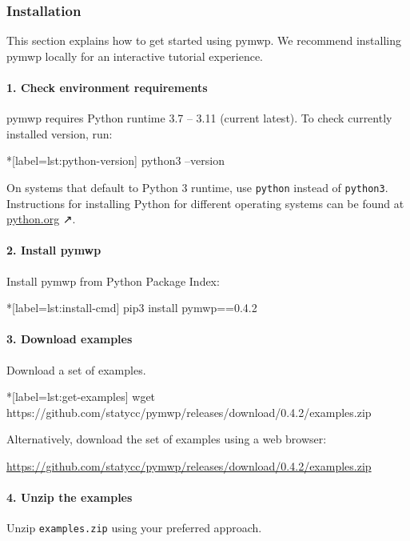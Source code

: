 \subsubsection{Installation}\label{guide-install}

This section explains how to get started using pymwp.
We recommend installing pymwp locally for an interactive tutorial experience.

\paragraph*{1. Check environment requirements}

pymwp requires Python runtime 3.7 -- 3.11 (current latest).
To check currently installed version, run:

\begin{cmdlisting}*[label={lst:python-version}]
python3 --version
\end{cmdlisting}

On systems that default to Python 3 runtime, use \texttt{python} instead of \texttt{python3}.
Instructions for installing Python for different operating systems can be found at \href{https://python.org}{python.org} ↗.

\paragraph*{2. Install pymwp}
Install pymwp from Python Package Index:

\begin{cmdlisting}*[label={lst:install-cmd}]
pip3 install pymwp==0.4.2
\end{cmdlisting}

\paragraph*{3. Download examples}
Download a set of examples.

\begin{cmdlisting}*[label={lst:get-examples}]
wget https://github.com/statycc/pymwp/releases/download/0.4.2/examples.zip
\end{cmdlisting}

Alternatively, download the set of examples using a web browser:

\url{https://github.com/statycc/pymwp/releases/download/0.4.2/examples.zip}

\paragraph*{4. Unzip the examples}
Unzip \texttt{examples.zip} using your preferred approach.

